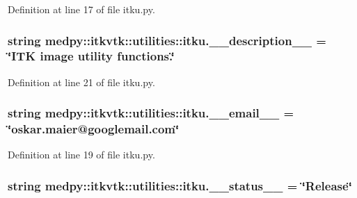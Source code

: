 Definition at line 17 of file itku.py.

\hypertarget{namespacemedpy_1_1itkvtk_1_1utilities_1_1itku_a98b3a1797a4bb142829f39eed678cdc5}{
\subsubsection[{\_\-\_\-description\_\-\_\-}]{\setlength{\rightskip}{0pt plus 5cm}string {\bf medpy::itkvtk::utilities::itku.\_\-\_\-description\_\-\_\-} = \char`\"{}ITK image utility functions.\char`\"{}}}
\label{namespacemedpy_1_1itkvtk_1_1utilities_1_1itku_a98b3a1797a4bb142829f39eed678cdc5}


Definition at line 21 of file itku.py.

\hypertarget{namespacemedpy_1_1itkvtk_1_1utilities_1_1itku_a4eea7c936d0a9f0992a6d9ec76e26c0d}{
\subsubsection[{\_\-\_\-email\_\-\_\-}]{\setlength{\rightskip}{0pt plus 5cm}string {\bf medpy::itkvtk::utilities::itku.\_\-\_\-email\_\-\_\-} = \char`\"{}oskar.maier@googlemail.com\char`\"{}}}
\label{namespacemedpy_1_1itkvtk_1_1utilities_1_1itku_a4eea7c936d0a9f0992a6d9ec76e26c0d}


Definition at line 19 of file itku.py.

\hypertarget{namespacemedpy_1_1itkvtk_1_1utilities_1_1itku_afd8c6d3932c4960580fdae3e3718718e}{
\subsubsection[{\_\-\_\-status\_\-\_\-}]{\setlength{\rightskip}{0pt plus 5cm}string {\bf medpy::itkvtk::utilities::itku.\_\-\_\-status\_\-\_\-} = \char`\"{}Release\char`\"{}}}
\label{namespacemedpy_1_1itkvtk_1_1utilities_1_1itku_afd8c6d3932c4960580fdae3e3718718e}


